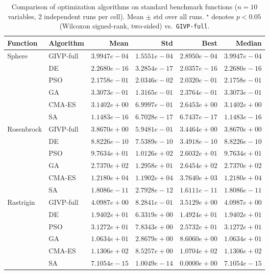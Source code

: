 
\begin{table}[htb]
\centering
\caption{Comparison of optimization algorithms on standard benchmark functions ($n=10$ variables, 2 independent runs per cell). Mean $\pm$ std over all runs. $^\star$ denotes $p < 0.05$ (Wilcoxon signed-rank, two-sided) vs.\ \texttt{GIVP-full}.}
\label{tab:benchmark_comparison}
\begin{tabular}{llrrrr}
\toprule
Function & Algorithm & Mean & Std & Best & Median \\
\midrule
  \multirow{6}{*}{Sphere} & GIVP-full & $3.9947e-04$ & $1.5551e-04$ & $2.8950e-04$ & $3.9947e-04$ \\
   & DE & $2.2680e-16$ & $3.2854e-17$ & $2.0357e-16$ & $2.2680e-16$ \\
   & PSO & $2.1758e-01$ & $2.0346e-02$ & $2.0320e-01$ & $2.1758e-01$ \\
   & GA & $3.3073e-01$ & $1.3165e-01$ & $2.3764e-01$ & $3.3073e-01$ \\
   & CMA-ES & $3.1402e+00$ & $6.9997e-01$ & $2.6453e+00$ & $3.1402e+00$ \\
   & SA & $1.1483e-16$ & $6.7028e-17$ & $6.7437e-17$ & $1.1483e-16$ \\
\midrule
  \multirow{6}{*}{Rosenbrock} & GIVP-full & $3.8670e+00$ & $5.9481e-01$ & $3.4464e+00$ & $3.8670e+00$ \\
   & DE & $8.8226e-10$ & $7.5389e-10$ & $3.4918e-10$ & $8.8226e-10$ \\
   & PSO & $9.7634e+01$ & $1.0126e+02$ & $2.6032e+01$ & $9.7634e+01$ \\
   & GA & $2.7370e+02$ & $1.2958e+01$ & $2.6454e+02$ & $2.7370e+02$ \\
   & CMA-ES & $1.2180e+04$ & $1.1902e+04$ & $3.7640e+03$ & $1.2180e+04$ \\
   & SA & $1.8086e-11$ & $2.7928e-12$ & $1.6111e-11$ & $1.8086e-11$ \\
\midrule
  \multirow{6}{*}{Rastrigin} & GIVP-full & $4.0987e+00$ & $8.2841e-01$ & $3.5129e+00$ & $4.0987e+00$ \\
   & DE & $1.9402e+01$ & $6.3319e+00$ & $1.4924e+01$ & $1.9402e+01$ \\
   & PSO & $3.1272e+01$ & $7.8343e+00$ & $2.5732e+01$ & $3.1272e+01$ \\
   & GA & $1.0634e+01$ & $2.8679e+00$ & $8.6060e+00$ & $1.0634e+01$ \\
   & CMA-ES & $1.1306e+02$ & $8.5257e+00$ & $1.0704e+02$ & $1.1306e+02$ \\
   & SA & $7.1054e-15$ & $1.0049e-14$ & $0.0000e+00$ & $7.1054e-15$ \\
\bottomrule
\end{tabular}


\end{table}
